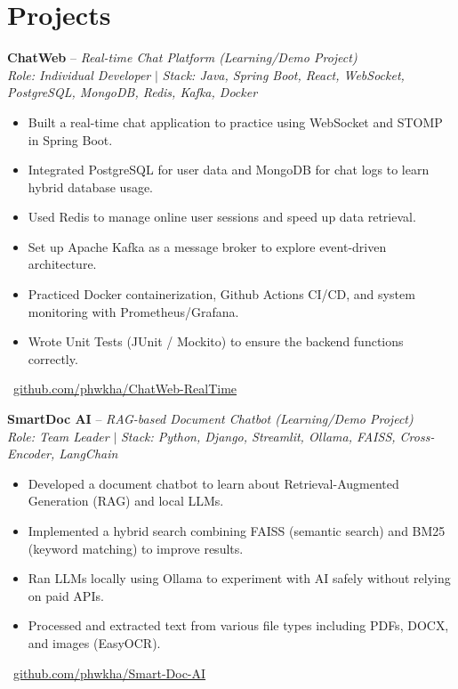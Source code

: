 \documentclass[a4paper,10pt]{article}
\begin{document}
\section{Projects}
\vspace{10pt}
\textbf{ChatWeb} -- \textit{Real-time Chat Platform (Learning/Demo Project)}  \\
\vspace{5pt}
\textit{Role: Individual Developer} $\vert$ \textit{Stack: Java, Spring Boot, React, WebSocket, PostgreSQL, MongoDB, Redis, Kafka, Docker}
\begin{itemize}[leftmargin=0.2in]
    \item Built a real-time chat application to practice using WebSocket and STOMP in Spring Boot.
    \item Integrated PostgreSQL for user data and MongoDB for chat logs to learn hybrid database usage.
    \item Used Redis to manage online user sessions and speed up data retrieval.
    \item Set up Apache Kafka as a message broker to explore event-driven architecture.
    \item Practiced Docker containerization, Github Actions CI/CD, and system monitoring with Prometheus/Grafana.
    \item Wrote Unit Tests (JUnit / Mockito) to ensure the backend functions correctly.
\end{itemize}
\vspace{5pt}
\begin{flushleft}\faGithub\ \href{https://github.com/phwkha/ChatWeb-RealTime.git}{github.com/phwkha/ChatWeb-RealTime}\end{flushleft}

\vspace{10pt} %
\textbf{SmartDoc AI} -- \textit{RAG-based Document Chatbot (Learning/Demo Project)}  \\
\vspace{5pt}
\textit{Role: Team Leader} $\vert$ \textit{Stack: Python, Django, Streamlit, Ollama, FAISS, Cross-Encoder, LangChain}
\begin{itemize}[leftmargin=0.2in]
    \item Developed a document chatbot to learn about Retrieval-Augmented Generation (RAG) and local LLMs.
    \item Implemented a hybrid search combining FAISS (semantic search) and BM25 (keyword matching) to improve results.
    \item Ran LLMs locally using Ollama to experiment with AI safely without relying on paid APIs.
    \item Processed and extracted text from various file types including PDFs, DOCX, and images (EasyOCR).
\end{itemize}
\vspace{5pt}
\begin{flushleft}\faGithub\ \href{https://github.com/phwkha/Smart-Doc-AI.git}{github.com/phwkha/Smart-Doc-AI}\end{flushleft}
\end{document}

